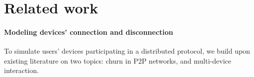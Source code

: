 \section{Related work}%
\label{RelatedWork}

\paragraph*{Modeling devices' connection and disconnection} 
To simulate users' devices participating in a distributed protocol, we build upon existing literature on two topics: 
churn in P2P networks, and multi-device interaction.